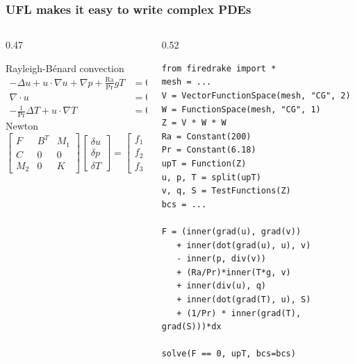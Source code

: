\documentclass[presentation,aspectratio=43, 10pt]{beamer}
\begin{document}
\begin{frame}[fragile,t]
  \frametitle{UFL makes it easy to write complex PDEs}
  \begin{columns}[T]
    \begin{column}{0.47\framewidth}
      \small
      \begin{block}{Rayleigh-B\'enard convection}
        \begin{equation*}
          \begin{split}
            -\Delta u + u\cdot\nabla u + \nabla p +
            \frac{\text{Ra}}{\text{Pr}} \hat{g}T &= 0 \\
            \nabla \cdot u &= 0 \\
            - \frac{1}{\text{Pr}} \Delta T + u\cdot \nabla T &= 0
          \end{split}
        \end{equation*}
        Newton
        \begin{equation*}
          \begin{bmatrix}
            F   & B^T & M_1 \\
            C   & 0   & 0   \\
            M_2 & 0 & K
          \end{bmatrix}
          \begin{bmatrix}
            \delta u \\
            \delta p \\
            \delta T
          \end{bmatrix} =
          \begin{bmatrix}
            f_1 \\
            f_2 \\
            f_3
          \end{bmatrix}
        \end{equation*}
      \end{block}
    \end{column}
    \begin{column}{0.52\framewidth}
\begin{verbatim}
from firedrake import *
mesh = ...
V = VectorFunctionSpace(mesh, "CG", 2)
W = FunctionSpace(mesh, "CG", 1)
Z = V * W * W
Ra = Constant(200)
Pr = Constant(6.18)
upT = Function(Z)
u, p, T = split(upT)
v, q, S = TestFunctions(Z)
bcs = ...

F = (inner(grad(u), grad(v))
   + inner(dot(grad(u), u), v)
   - inner(p, div(v))
   + (Ra/Pr)*inner(T*g, v)
   + inner(div(u), q)
   + inner(dot(grad(T), u), S)
   + (1/Pr) * inner(grad(T), grad(S)))*dx

solve(F == 0, upT, bcs=bcs)
\end{verbatim}
    \end{column}
  \end{columns}
\end{frame}
\end{document}
